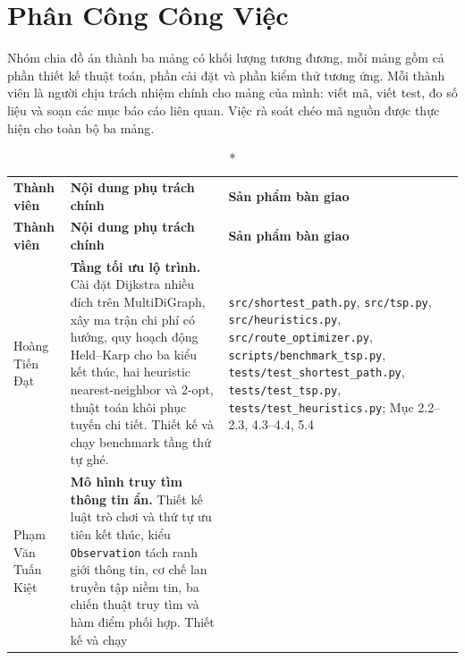 \chapter*{Phân Công Công Việc}

Nhóm chia đồ án thành ba mảng có khối lượng tương đương, mỗi mảng gồm cả phần
thiết kế thuật toán, phần cài đặt và phần kiểm thử tương ứng. Mỗi thành viên là
người chịu trách nhiệm chính cho mảng của mình: viết mã, viết test, đo số liệu và
soạn các mục báo cáo liên quan. Việc rà soát chéo mã nguồn được thực hiện cho
toàn bộ ba mảng.

\footnotesize
\begin{longtable}{>{\raggedright\arraybackslash}p{2.8cm}>{\raggedright\arraybackslash}p{5.75cm}p{6.15cm}}
\caption*{\textbf{Bảng phân công nhiệm vụ giữa các thành viên}}\\
\toprule
\textbf{Thành viên} & \textbf{Nội dung phụ trách chính} & \textbf{Sản phẩm bàn giao} \\
\midrule
\endfirsthead
\toprule
\textbf{Thành viên} & \textbf{Nội dung phụ trách chính} & \textbf{Sản phẩm bàn giao} \\
\midrule
\endhead
Hoàng Tiến Đạt\newline 23010864
&
\textbf{Tầng tối ưu lộ trình.} Cài đặt Dijkstra nhiều đích trên MultiDiGraph,
xây ma trận chi phí có hướng, quy hoạch động Held--Karp cho ba kiểu kết thúc,
hai heuristic nearest-neighbor và 2-opt, thuật toán khôi phục tuyến chi tiết.
Thiết kế và chạy benchmark tầng thứ tự ghé.
&
\texttt{src/shortest\_path.py},\newline
\texttt{src/tsp.py},\newline
\texttt{src/heuristics.py},\newline
\texttt{src/route\_optimizer.py},\newline
\texttt{scripts/benchmark\_tsp.py},\newline
\texttt{tests/test\_shortest\_path.py},\newline
\texttt{tests/test\_tsp.py},\newline
\texttt{tests/test\_heuristics.py};\newline
Mục 2.2--2.3, 4.3--4.4, 5.4 \\
\addlinespace
Phạm Văn Tuấn Kiệt\newline 23010881
&
\textbf{Mô hình truy tìm thông tin ẩn.} Thiết kế luật trò chơi và thứ tự ưu tiên
kết thúc, kiểu \texttt{Observation} tách ranh giới thông tin, cơ chế lan truyền
tập niềm tin, ba chiến thuật truy tìm và hàm điểm phối hợp. Thiết kế và chạy

\end{longtable}
